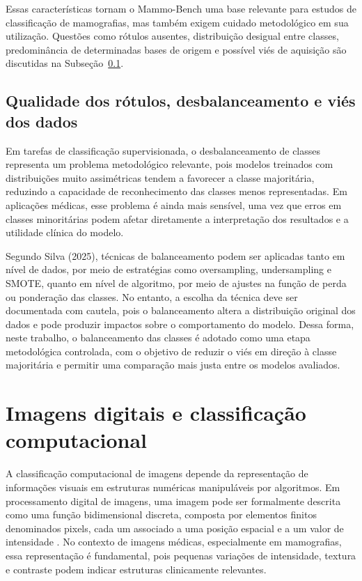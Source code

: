 \documentclass[
    12pt,
    openright,
    oneside,
    a4paper,
    english,
    brazil
]{abntex2}
\begin{document}
Essas características tornam o Mammo-Bench uma base relevante para estudos de classificação de mamografias, mas também exigem cuidado metodológico em sua utilização. Questões como rótulos ausentes, distribuição desigual entre classes, predominância de determinadas bases de origem e possível viés de aquisição são discutidas na Subseção~\ref{subsec:qualidade_rotulos_balanceamento_vies}.



\subsection{Qualidade dos rótulos, desbalanceamento e viés dos dados}
\label{subsec:qualidade_rotulos_balanceamento_vies}

Em tarefas de classificação supervisionada, o desbalanceamento de classes representa um problema metodológico relevante, pois modelos treinados com distribuições muito assimétricas tendem a favorecer a classe majoritária, reduzindo a capacidade de reconhecimento das classes menos representadas. Em aplicações médicas, esse problema é ainda mais sensível, uma vez que erros em classes minoritárias podem afetar diretamente a interpretação dos resultados e a utilidade clínica do modelo.

Segundo Silva (2025), técnicas de balanceamento podem ser aplicadas tanto em nível de dados, por meio de estratégias como oversampling, undersampling e SMOTE, quanto em nível de algoritmo, por meio de ajustes na função de perda ou ponderação das classes. No entanto, a escolha da técnica deve ser documentada com cautela, pois o balanceamento altera a distribuição original dos dados e pode produzir impactos sobre o comportamento do modelo. Dessa forma, neste trabalho, o balanceamento das classes é adotado como uma etapa metodológica controlada, com o objetivo de reduzir o viés em direção à classe majoritária e permitir uma comparação mais justa entre os modelos avaliados.

\section{Imagens digitais e classificação computacional}

A classificação computacional de imagens depende da representação de informações visuais em estruturas numéricas manipuláveis por algoritmos. Em processamento digital de imagens, uma imagem pode ser formalmente descrita como uma função bidimensional discreta, composta por elementos finitos denominados pixels, cada um associado a uma posição espacial e a um valor de intensidade \cite{gonzalez2008digital}. No contexto de imagens médicas, especialmente em mamografias, essa representação é fundamental, pois pequenas variações de intensidade, textura e contraste podem indicar estruturas clinicamente relevantes.
\end{document}
